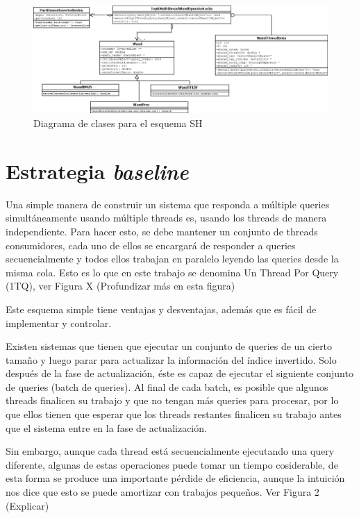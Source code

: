 \begin{figure}[H]
\centering
\includegraphics[scale=.75]{images/TopKMultiThreadWandOperatorLocks.png}
\caption{Diagrama de clases para el esquema SH}
\label{fig:TopKMultiThreadWandOperatorLocks}
\end{figure}


\section{Estrategia \textit{baseline}}
\label{scheduling:baseline}
Una simple manera de construir un sistema que responda a múltiple queries simultáneamente usando múltiple threads es, usando los threads de manera independiente. Para hacer esto, se debe mantener un conjunto de threads consumidores, cada uno de ellos se encargará de responder a queries secuencialmente y todos ellos trabajan en paralelo leyendo las queries desde la misma cola. Esto es lo que en este trabajo se denomina Un Thread Por Query (1TQ), ver Figura X (Profundizar más en esta figura)

Este esquema simple tiene ventajas y desventajas, además que es fácil de implementar y controlar. 

Existen sistemas que tienen que ejecutar un conjunto de queries de un cierto tamaño y luego parar para actualizar la información del índice invertido. Solo después de la fase de actualización, éste es capaz de ejecutar el siguiente conjunto de queries (batch de queries). Al final de cada batch, es posible que algunos threads finalicen su trabajo y que no tengan más queries para procesar, por lo que ellos tienen que esperar que los threads restantes finalicen su trabajo antes que el sistema entre en la fase de actualización. 

Sin embargo, aunque cada thread está secuencialmente ejecutando una query diferente, algunas de estas operaciones puede tomar un tiempo cosiderable, de esta forma se produce una importante pérdide de eficiencia, aunque la intuición nos dice que esto se puede amortizar con trabajos pequeños. Ver Figura 2 (Explicar)




